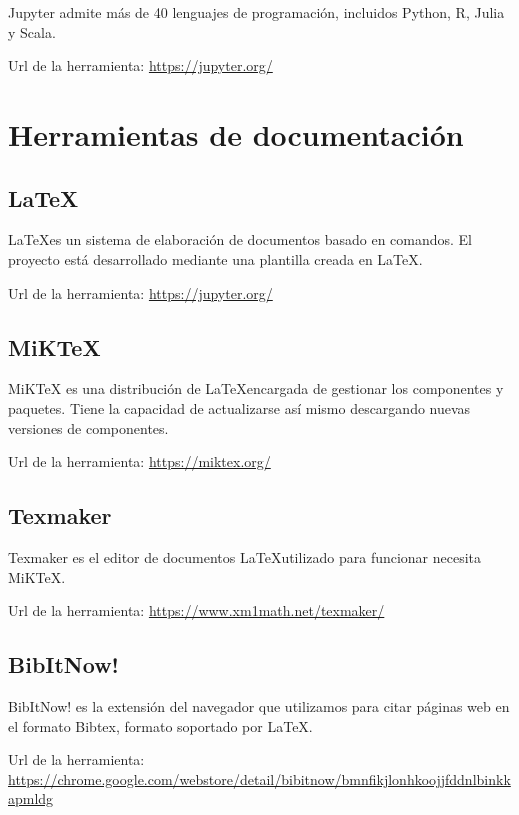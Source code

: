 Jupyter admite más de 40 lenguajes de programación, incluidos Python, R, Julia y Scala.

Url de la herramienta: \url{https://jupyter.org/}

\section{Herramientas de documentación}
\subsection{\LaTeX}
\LaTeX es un sistema de elaboración de documentos basado en comandos. El proyecto está desarrollado mediante una plantilla creada en \LaTeX.

Url de la herramienta: \url{https://jupyter.org/}

\subsection{MiKTeX}
MiKTeX es una distribución de \LaTeX encargada de gestionar los componentes y paquetes. Tiene la capacidad de actualizarse así mismo descargando nuevas versiones de componentes.

Url de la herramienta: \url{https://miktex.org/}

\subsection{Texmaker}
Texmaker es el editor de documentos \LaTeX utilizado para funcionar necesita MiKTeX.

Url de la herramienta: \url{https://www.xm1math.net/texmaker/}

\subsection{BibItNow!}
BibItNow! es la extensión del navegador que utilizamos para citar páginas web en el formato Bibtex, formato soportado por \LaTeX.

Url de la herramienta: \url{https://chrome.google.com/webstore/detail/bibitnow/bmnfikjlonhkoojjfddnlbinkkapmldg}

